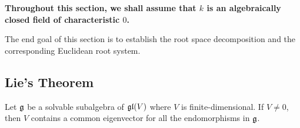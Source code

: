 \begin{center}
\textbf{Throughout this section, we shall assume that $k$ is an algebraically closed field of characteristic $0$.}
\end{center}

The end goal of this section is to establish the root space decomposition and the corresponding Euclidean root system.

\subsection{Lie's Theorem}

\begin{theorem}
    Let $\mathfrak{g}$ be a solvable subalgebra of $\mathfrak{gl}(V)$ where $V$ is finite-dimensional. If $V\ne 0$, then $V$ contains a common eigenvector for all the endomorphisms in $\mathfrak{g}$.
\end{theorem}

